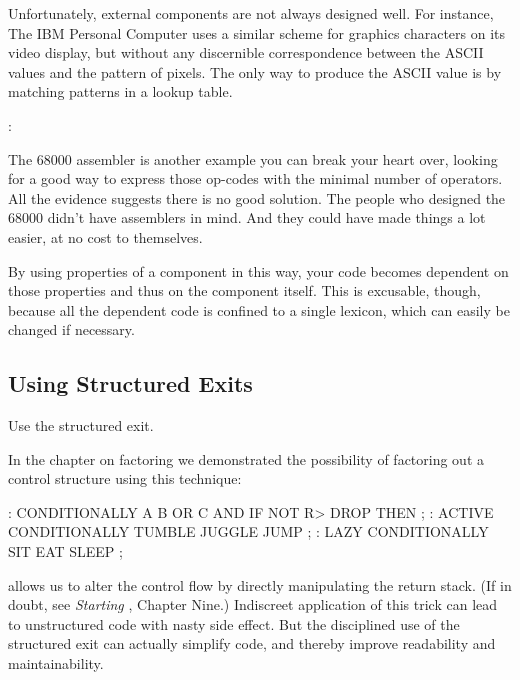 Unfortunately, external components are not always designed well.
For instance, The IBM Personal Computer uses a similar scheme for
graphics characters on its video display, but without any discernible
correspondence between the ASCII values and the pattern of pixels. The
only way to produce the ASCII value is by matching patterns in a lookup
table.

\begin{interview}
:
\begin{tfquot}
The 68000 assembler is another example you can break your heart over,
looking for a good way to express those op-codes with the minimal number
of operators. All the evidence suggests there is no good solution. The people
who designed the 68000 didn't have assemblers in mind. And they could
have made things a lot easier, at no cost to themselves.
\end{tfquot}
\end{interview}
By using properties of a component in this way, your code becomes
dependent on those properties and thus on the component itself. This is
excusable, though, because all the dependent code is confined to a single
lexicon, which can easily be changed if necessary.

\subsection{Using Structured Exits}

\begin{tip}
Use the structured exit.
\end{tip}
In the chapter on factoring we demonstrated the possibility of factoring
out a control structure using this technique:

\begin{Code}
: CONDITIONALLY   A B OR  C AND  IF  NOT R> DROP  THEN ;
: ACTIVE   CONDITIONALLY   TUMBLE JUGGLE JUMP ;
: LAZY   CONDITIONALLY  SIT  EAT  SLEEP ;
\end{Code}
\Forth{} allows us to alter the control flow by directly manipulating the
return stack. (If in doubt, see \emph{Starting \Forth{}}, Chapter Nine.)
Indiscreet application of this trick can lead to unstructured code with nasty
side effect. But the disciplined use of the structured exit can actually
simplify code, and thereby improve readability and maintainability.

